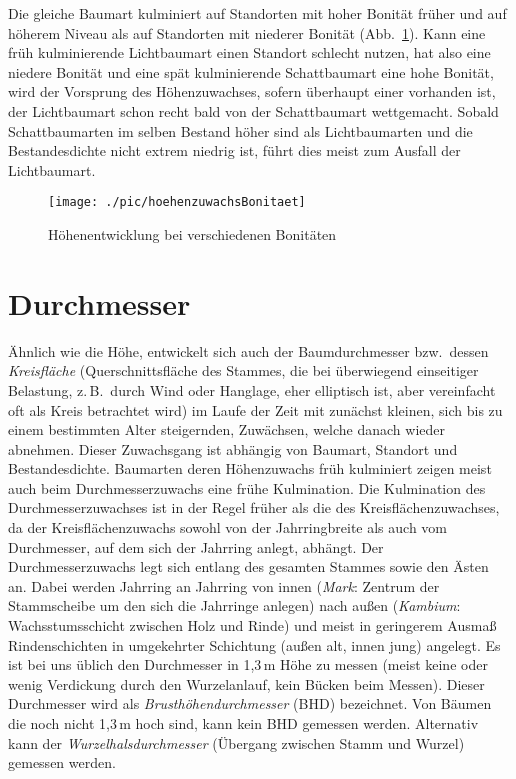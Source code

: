 \documentclass[twocolumn]{scrartcl}
\begin{document}
Die gleiche Baumart kulminiert auf Standorten mit hoher Bonität früher und auf
höherem Niveau als auf Standorten mit niederer Bonität
(Abb.~\ref{fig:hoeheAlterBonitaeten}). Kann eine früh kulminierende Lichtbaumart
einen Standort schlecht nutzen, hat also eine niedere Bonität und eine spät
kulminierende Schattbaumart eine hohe Bonität, wird der Vorsprung des
Höhenzuwachses, sofern überhaupt einer vorhanden ist, der Lichtbaumart schon
recht bald von der Schattbaumart wettgemacht. Sobald Schattbaumarten im selben
Bestand höher sind als Lichtbaumarten und die Bestandesdichte nicht extrem
niedrig ist, führt dies meist zum Ausfall der Lichtbaumart.

\begin{figure}[htbp]
  \centering
  \texttt{[image: ./pic/hoehenzuwachsBonitaet]}
  \caption{Höhenentwicklung bei verschiedenen Bonitäten}
  \label{fig:hoeheAlterBonitaeten}
\end{figure}

\section{Durchmesser}

Ähnlich wie die Höhe, entwickelt sich auch der Baumdurchmesser bzw.\ dessen
\emph{Kreisfläche} (Querschnittsfläche des Stammes, die bei
überwiegend einseitiger Belastung, z.\,B.\ durch Wind oder Hanglage, eher
elliptisch ist, aber vereinfacht oft als Kreis betrachtet wird) im Laufe der
Zeit mit zunächst kleinen, sich bis zu einem bestimmten Alter steigernden,
Zuwächsen, welche danach wieder abnehmen. Dieser Zuwachsgang ist abhängig von
Baumart, Standort und Bestandesdichte. Baumarten deren Höhenzuwachs früh
kulminiert zeigen meist auch beim Durchmesserzuwachs eine frühe Kulmination. Die
Kulmination des Durchmesserzuwachses ist in der Regel früher als die des
Kreisflächenzuwachses, da der Kreisflächenzuwachs sowohl von der Jahrringbreite
als auch vom Durchmesser, auf dem sich der Jahrring anlegt, abhängt. Der
Durchmesserzuwachs legt sich entlang des gesamten Stammes sowie den Ästen an.
Dabei werden Jahrring an Jahrring von innen (\emph{Mark}: Zentrum
der Stammscheibe um den sich die Jahrringe anlegen) nach außen
(\emph{Kambium}: Wachsstumsschicht zwischen Holz und Rinde) und
meist in geringerem Ausmaß Rindenschichten in umgekehrter Schichtung (außen alt,
innen jung) angelegt. Es ist bei uns üblich den Durchmesser in 1,3\,m Höhe zu
messen (meist keine oder wenig Verdickung durch den Wurzelanlauf, kein Bücken
beim Messen). Dieser Durchmesser wird als
\emph{Brusthöhendurchmesser}
(BHD) bezeichnet. Von Bäumen die noch nicht
1,3\,m hoch sind, kann kein BHD gemessen werden. Alternativ kann der
\emph{Wurzelhalsdurchmesser} (Übergang zwischen
Stamm und Wurzel) gemessen werden.
\end{document}
